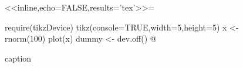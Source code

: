 \documentclass{article}
\begin{document}
   \begin{figure}[ht]
     \centering
 <<inline,echo=FALSE,results='tex'>>=
 
 require(tikzDevice)
 tikz(console=TRUE,width=5,height=5)
   x <- rnorm(100)
   plot(x)
 dummy <- dev.off()
 @
     \caption{caption}
     \label{fig:inline}
   \end{figure}
 
\end{document}
